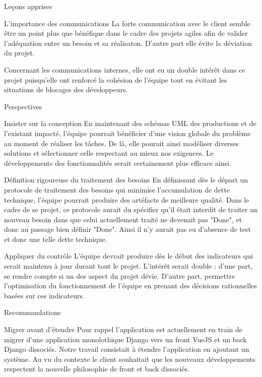 \documentclass[]{article}
\begin{document}
{\begin{section}{Leçons apprises}
 \begin{subsection}{L'importance des communications}
    La forte communication avec le client semble être un point plus que bénéfique dans le cadre des projets agiles afin de valider l'adéquation entre un besoin et sa réalisaton. D'autre part elle évite la déviation du projet.

    Concernant les communications internes, elle ont eu un double intérêt dans ce projet puisqu'elle ont renforcé la cohésion de l'équipe tout en évitant les situations de blocages des développeurs.
 \end{subsection}
\end{section}

\begin{section}{Perspectives}
 \begin{subsection}{Insister sur la conception}
     En maintenant des schémas UML des productions et de l'existant impacté, l'équipe pourrait bénéficier d'une vision globale du problème au moment de réaliser les tâches. De là, elle pourait ainsi modéliser diverses solutions et sélectionner celle respectant au mieux nos exigences. Le développements des fonctionnalités serait certainement plus efficace ainsi.
 \end{subsection}

 \begin{subsection}{Définition rigoureuse du traitement des besoins}
    En définissant dès le départ un protocole de traitement des besoins qui minimise l'accumulation de dette technique, l'équipe pourrait produire des artéfacts de meilleure qualité. Dans le cadre de se projet, ce protocole aurait du spécifier qu'il était interdit de traiter un nouveau besoin dans que celui actuellement traité ne devenait pas "Done", et donc au passage bien définir "Done". Ainsi il n'y aurait pas eu d'absence de test et donc une telle dette technique.
 \end{subsection}

 \begin{subsection}{Appliquer du contrôle}
    L'équipe devrait produire dès le début des indicateurs qui serait maintenu à jour durant tout le projet. L'intérêt serait double : d'une part, se rendre compte si un des aspect du projet dévie. D'autre part, permettre l'optimisation du fonctionnement de l'équipe en prenant des décisions rationnelles basées sur ces indicateurs.  
 \end{subsection}
\end{section}

\begin{section}{Recommandations}
 \begin{subsection}{Migrer avant d'étendre}
     Pour rappel l'application est actuellement en train de migrer d'une application monolothique Django vers un front VueJS et un back Django dissociés. Notre travail consistait à étendre l'application en ajoutant un système. Au vu du contexte le client souhaitait que les nouveaux développements respectent la nouvelle philosophie de front et back dissociés.


\end{subsection}
\end{section}}
\end{document}
